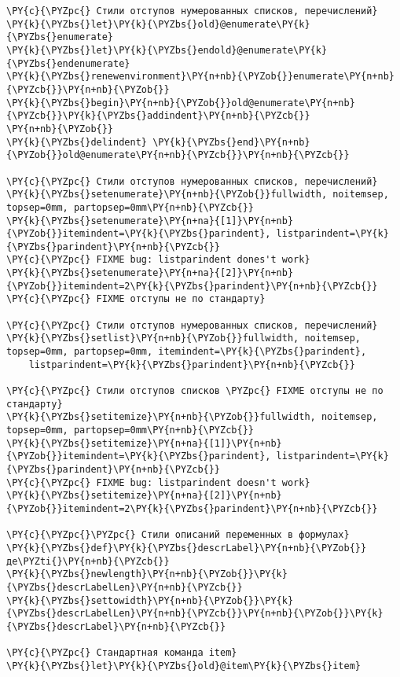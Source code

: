 \begin{Verbatim}[commandchars=\\\{\}]
\PY{c}{\PYZpc{} Стили отступов нумерованных списков, перечислений}
\PY{k}{\PYZbs{}let}\PY{k}{\PYZbs{}old}@enumerate\PY{k}{\PYZbs{}enumerate}
\PY{k}{\PYZbs{}let}\PY{k}{\PYZbs{}endold}@enumerate\PY{k}{\PYZbs{}endenumerate}
\PY{k}{\PYZbs{}renewenvironment}\PY{n+nb}{\PYZob{}}enumerate\PY{n+nb}{\PYZcb{}}\PY{n+nb}{\PYZob{}}
\PY{k}{\PYZbs{}begin}\PY{n+nb}{\PYZob{}}old@enumerate\PY{n+nb}{\PYZcb{}}\PY{k}{\PYZbs{}addindent}\PY{n+nb}{\PYZcb{}}
\PY{n+nb}{\PYZob{}}
\PY{k}{\PYZbs{}delindent} \PY{k}{\PYZbs{}end}\PY{n+nb}{\PYZob{}}old@enumerate\PY{n+nb}{\PYZcb{}}\PY{n+nb}{\PYZcb{}}

\PY{c}{\PYZpc{} Стили отступов нумерованных списков, перечислений}
\PY{k}{\PYZbs{}setenumerate}\PY{n+nb}{\PYZob{}}fullwidth, noitemsep, topsep=0mm, partopsep=0mm\PY{n+nb}{\PYZcb{}}
\PY{k}{\PYZbs{}setenumerate}\PY{n+na}{[1]}\PY{n+nb}{\PYZob{}}itemindent=\PY{k}{\PYZbs{}parindent}, listparindent=\PY{k}{\PYZbs{}parindent}\PY{n+nb}{\PYZcb{}}
\PY{c}{\PYZpc{} FIXME bug: listparindent dones't work}
\PY{k}{\PYZbs{}setenumerate}\PY{n+na}{[2]}\PY{n+nb}{\PYZob{}}itemindent=2\PY{k}{\PYZbs{}parindent}\PY{n+nb}{\PYZcb{}} \PY{c}{\PYZpc{} FIXME отступы не по стандарту}

\PY{c}{\PYZpc{} Стили отступов нумерованных списков, перечислений}
\PY{k}{\PYZbs{}setlist}\PY{n+nb}{\PYZob{}}fullwidth, noitemsep, topsep=0mm, partopsep=0mm, itemindent=\PY{k}{\PYZbs{}parindent},
    listparindent=\PY{k}{\PYZbs{}parindent}\PY{n+nb}{\PYZcb{}}

\PY{c}{\PYZpc{} Стили отступов списков \PYZpc{} FIXME отступы не по стандарту}
\PY{k}{\PYZbs{}setitemize}\PY{n+nb}{\PYZob{}}fullwidth, noitemsep, topsep=0mm, partopsep=0mm\PY{n+nb}{\PYZcb{}}
\PY{k}{\PYZbs{}setitemize}\PY{n+na}{[1]}\PY{n+nb}{\PYZob{}}itemindent=\PY{k}{\PYZbs{}parindent}, listparindent=\PY{k}{\PYZbs{}parindent}\PY{n+nb}{\PYZcb{}} 
\PY{c}{\PYZpc{} FIXME bug: listparindent doesn't work}
\PY{k}{\PYZbs{}setitemize}\PY{n+na}{[2]}\PY{n+nb}{\PYZob{}}itemindent=2\PY{k}{\PYZbs{}parindent}\PY{n+nb}{\PYZcb{}}

\PY{c}{\PYZpc{}\PYZpc{} Стили описаний переменных в формулах}
\PY{k}{\PYZbs{}def}\PY{k}{\PYZbs{}descrLabel}\PY{n+nb}{\PYZob{}}де\PYZti{}\PY{n+nb}{\PYZcb{}}
\PY{k}{\PYZbs{}newlength}\PY{n+nb}{\PYZob{}}\PY{k}{\PYZbs{}descrLabelLen}\PY{n+nb}{\PYZcb{}}
\PY{k}{\PYZbs{}settowidth}\PY{n+nb}{\PYZob{}}\PY{k}{\PYZbs{}descrLabelLen}\PY{n+nb}{\PYZcb{}}\PY{n+nb}{\PYZob{}}\PY{k}{\PYZbs{}descrLabel}\PY{n+nb}{\PYZcb{}}

\PY{c}{\PYZpc{} Стандартная команда item}
\PY{k}{\PYZbs{}let}\PY{k}{\PYZbs{}old}@item\PY{k}{\PYZbs{}item}


\end{Verbatim}
